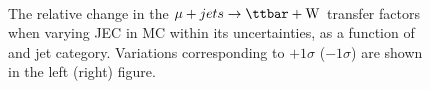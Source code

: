 \begin{figure}[!h]
  \centering
   ~~
  \\

  \caption{\label{fig:tfSyst_jec_muToTtw} The relative change in the
  $\mj \rightarrow \mathrm{\ttbar+W}$ transfer
  factors when varying JEC in MC within its uncertainties, as a function of \scalht and jet category. 
  Variations corresponding to $+1\sigma$ ($-1\sigma$) are shown in the left (right) figure. 
  }
\end{figure}




